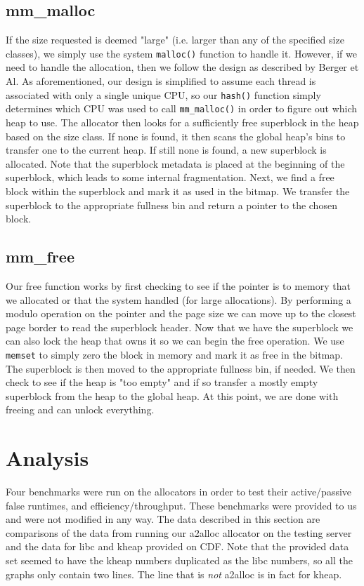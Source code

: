 \documentclass[11pt,twoside]{article}
\newcommand{\inlinecode}{\texttt}
\begin{document}
\subsection{mm\_malloc}
If the size requested is deemed "large" (i.e. larger than any of the specified size classes), we simply use the system \inlinecode{malloc()} function to handle it. However, if we need to handle the allocation, then we follow the design as described by Berger et Al. As aforementioned, our design is simplified to assume each thread is associated with only a single unique CPU, so our \inlinecode{hash()} function simply determines which CPU was used to call \inlinecode{mm\_malloc()} in order to figure out which heap to use. The allocator then looks for a sufficiently free superblock in the heap based on the size class. If none is found, it then scans the global heap's bins to transfer one to the current heap. If still none is found, a new superblock is allocated. Note that the superblock metadata is placed at the beginning of the superblock, which leads to some internal fragmentation. Next, we find a free block within the superblock and mark it as used in the bitmap. We transfer the superblock to the appropriate fullness bin and return a pointer to the chosen block.

\subsection{mm\_free}
Our free function works by first checking to see if the pointer is to memory that we allocated or that the system handled (for large allocations). By performing a modulo operation on the pointer and the page size we can move up to the closest page border to read the superblock header. Now that we have the superblock we can also lock the heap that owns it so we can begin the free operation. We use \inlinecode{memset} to simply zero the block in memory and mark it as free in the bitmap. The superblock is then moved to the appropriate fullness bin, if needed. We then check to see if the heap is "too empty" and if so transfer a mostly empty superblock from the heap to the global heap. At this point, we are done with freeing and can unlock everything.


\section{Analysis}
Four benchmarks were run on the allocators in order to test their active/passive false runtimes, and efficiency/throughput. These benchmarks were provided to us and were not modified in any way. The data described in this section are comparisons of the data from running our a2alloc allocator on the testing server and the data for libc and kheap provided on CDF. Note that the provided data set seemed to have the kheap numbers duplicated as the libc numbers, so all the graphs only contain two lines. The line that is \textit{not} a2alloc is in fact for kheap. 
\end{document}
